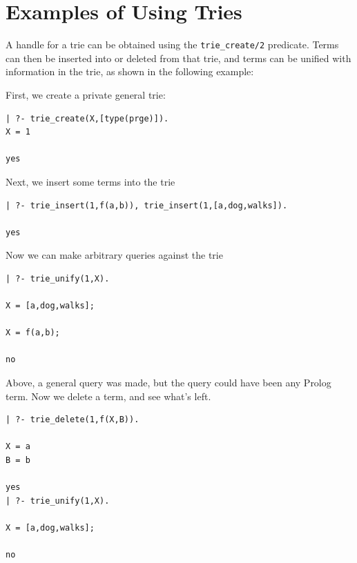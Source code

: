 \section{Examples of Using Tries}
%
A handle for a trie can be obtained using the {\tt trie\_create/2}
predicate.  Terms can then be inserted into or deleted from that trie,
and terms can be unified with information in the trie, as shown in the
following example:

\begin{example} \rm
First, we create a private general trie: 
{\small
\begin{verbatim}
| ?- trie_create(X,[type(prge)]).
X = 1

yes
\end{verbatim}
}
%
Next, we insert some terms into the trie
{\small
\begin{verbatim}
| ?- trie_insert(1,f(a,b)), trie_insert(1,[a,dog,walks]).

yes
\end{verbatim}
}
Now we can make arbitrary queries against the trie
{\small
\begin{verbatim}
| ?- trie_unify(1,X).

X = [a,dog,walks];

X = f(a,b);

no
\end{verbatim}
}
\noindent
Above, a general query was made, but the query could have been any
Prolog term.  Now we delete a term, and see what's left.
{\small
\begin{verbatim}
| ?- trie_delete(1,f(X,B)).

X = a
B = b

yes
| ?- trie_unify(1,X).

X = [a,dog,walks];

no
\end{verbatim}
}
\end{example}

